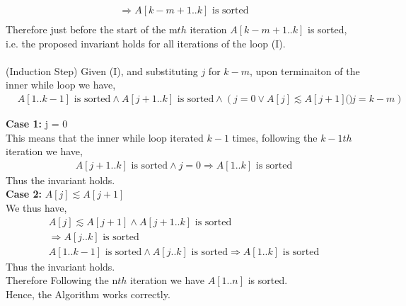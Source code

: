 \documentclass[12pt]{article}
\newenvironment{lemma}[2][Lemma]{\begin{trivlist}
\item[\hskip \labelsep {\bfseries #1}\hskip \labelsep {\bfseries #2.}]}{\end{trivlist}}
\newenvironment{question}[2][Question]{\begin{trivlist}
\item[\hskip \labelsep {\bfseries #1}\hskip \labelsep {\bfseries #2.}]}{\end{trivlist}}
\begin{document}
\begin{question}{1 (b)}
\begin{lemma}{1.4}
\begin{align*}
      & \Rightarrow A[k-m+1..k] \text{ is sorted} &\\
    \end{align*}
    Therefore just before the start of the m$th$ iteration $A[k-m+1..k]$ is sorted,
    i.e. the proposed invariant holds for all iterations of the loop (I).\\ \\
    (Induction Step) Given (I), and substituting $j$ for $k-m$, upon terminaiton
    of the inner while loop we have,
    \begin{align*}
      & A[1..k-1] \text{ is sorted} \land A[j + 1..k] \text{ is sorted} \land (j = 0 \lor A[j] \lesssim A[j + 1]) & (j = k - m)
    \end{align*}

    \textbf{Case 1:} j = 0\\
    This means that the inner while loop iterated $k-1$ times, following the
    $k-1th$ iteration we have,
    \begin{align*}
      A[j + 1..k] \text{ is sorted} \land j = 0 \Rightarrow A[1..k] \text{ is sorted}
    \end{align*}
    Thus the invariant holds. \\

    \textbf{Case 2:} $A[j] \lesssim A[j + 1]$ \\
    We thus have,
    \begin{align*}
      & A[j] \lesssim A[j + 1] \land A[j + 1..k] \text{ is sorted} & \\
      & \Rightarrow A[j..k] \text{ is sorted} & \\
      & A[1..k-1] \text{ is sorted} \land A[j..k] \text{ is sorted} \Rightarrow A[1..k] \text{ is sorted}
    \end{align*}
    Thus the invariant holds.\\
    Therefore Following the n$th$ iteration we have $A[1..n]$ is sorted.\\
    Hence, the Algorithm works correctly.
  \end{lemma}


\end{question}
\end{document}
